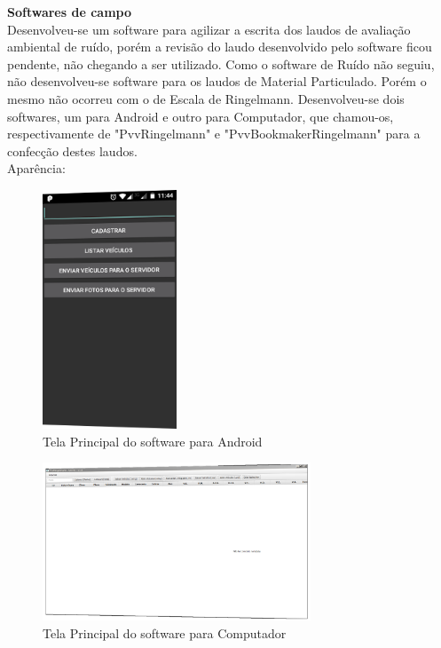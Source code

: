 \documentclass[12pt,a4paper,oneside,sumario=tradicional,brazil]{abntex2}
\begin{document}
	\textbf{{\Large Softwares de campo}} \\
	\indent
	Desenvolveu-se um software para agilizar a escrita dos laudos de avaliação ambiental de ruído, porém a revisão do laudo desenvolvido pelo software ficou pendente, não chegando a ser utilizado. Como o software de Ruído não seguiu, não desenvolveu-se software para os laudos de Material Particulado. Porém o mesmo não ocorreu com o de Escala de Ringelmann. Desenvolveu-se dois softwares, um para Android e outro para Computador, que chamou-os, respectivamente de "PvvRingelmann" e "PvvBookmakerRingelmann" para a confecção destes laudos. \\
	\indent
	Aparência: \\
	\begin{minipage}{\linewidth}
		\centering
		\begin{minipage}{0.45\linewidth}
			\begin{figure}[H]
				\centering
				\includegraphics[width=4cm]{imgs/PvvRingelmann-principal.png}
				\caption{Tela Principal do software para Android}
			\end{figure}
		\end{minipage}
		\hspace{0.05\linewidth}
		\begin{minipage}{0.45\linewidth}
			\begin{figure}[H]
				\includegraphics[width=8cm]{imgs/PvvBookmakerRingelmann-principal-border.png}
				\caption{Tela Principal do software para Computador}
			\end{figure}
		\end{minipage}
	\end{minipage} \\
\end{document}
